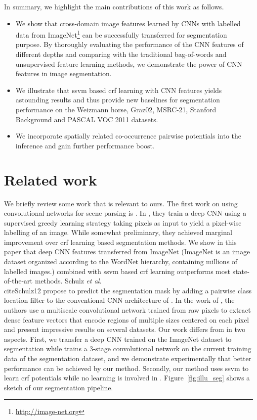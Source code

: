 \documentclass[10pt,3p]{elsarticle}
\def\onedot{.\xspace}
\def\etal{\emph{et al}\onedot}
\newcommand{\ssvm}{{\sc ssvm}\xspace}
\newcommand{\crf}{{\sc crf}\xspace}
\begin{document}
In summary, we highlight the main contributions of this work as follows.
\begin{itemize}
\item 
We show that cross-domain image features learned by CNNs with labelled data from
ImageNet\footnote{\url{http://image-net.org}} can be successfully transferred for segmentation purpose.
By thoroughly evaluating the performance of the CNN features of different depths and comparing with the traditional bag-of-words and unsupervised feature learning methods, we demonstrate the power of CNN features in image segmentation.
\item 
We illustrate that \ssvm based \crf learning with CNN features yields astounding results and thus provide new baselines for segmentation performance on the Weizmann horse, Graz02, MSRC-21, Stanford Background and PASCAL VOC 2011 datasets.
\item 
We incorporate spatially related co-occurrence pairwise potentials into the inference and gain further performance boost.


\end{itemize}





\section{Related work}
We briefly review some work that is relevant to ours.
The first work on using convolutional networks for scene parsing is \cite{Grangier09}.
In \cite{Grangier09}, they train a deep CNN using a supervised greedy learning strategy taking pixels as input to yield a pixel-wise labelling of an image. While somewhat preliminary, they achieved marginal improvement over \crf learning based segmentation methods. We show in this paper that deep CNN features transferred from ImageNet (ImageNet is an image dataset organized according to the WordNet hierarchy, containing millions of labelled images.) combined with \ssvm based \crf learning outperforms most state-of-the-art methods.
Schulz \etal \\cite{Schulz12} propose to predict the segmentation mask by adding a pairwise class location filter to the conventional CNN architecture of \cite{Lecun98}. In the work of \cite{Lecun13}, the authors use a multiscale convolutional network trained from raw pixels to extract dense feature vectors that encode regions of multiple sizes centered on each pixel and present impressive results on several datasets.
Our work differs from \cite{Lecun13} in two aspects. First, we transfer a deep CNN trained on the ImageNet \cite{deepCNN12} dataset  to segmentation while \cite{Lecun13} trains a 3-stage convolutional network \cite{Lecun98} on the current training data of the segmentation dataset, and we demonstrate experimentally that better performance can be achieved by our method.
Secondly, our method uses \ssvm to learn \crf potentials while no learning is involved in \cite{Lecun13}.
Figure~\ref{fig:illu_seg} shows a sketch of our segmentation pipeline.
\end{document}

